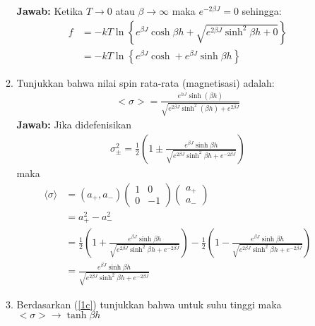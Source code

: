 \documentclass[a4paper , 12pt, cc]{article}
\begin{document}
\begin{enumerate}
\begin{enumerate}
 \textbf{Jawab:} \newline 
 Ketika $T \rightarrow 0$ atau $\beta \rightarrow \infty $ maka $e^{- 2 \beta J} = 0$ sehingga:
 \begin{align}
 f &= - kT \ln \left\{ e^{\beta J} \cosh \beta h + \sqrt{e^{2 \beta J} \sinh^2 \beta h + 0} \right\} \nonumber \\
 & =\boxed{ - kT \ln \left\lbrace e^{\beta J} \cosh + e^{\beta J}\sinh \beta h  \right \rbrace }
 \end{align}
\item \label{1c}Tunjukkan bahwa nilai spin rata-rata (magnetisasi) adalah:
\begin{align}
<\sigma> = \frac{e^{hJ} \sinh (\beta h)}{\sqrt{ e^{2 \beta J} \sinh^2 (\beta h) + e^{2 \beta J}}}
\end{align}
\textbf{Jawab:} \newline 
Jika didefenisikan 
\begin{align}
\sigma_{\pm}^2 = \frac{1}{2} \left( 1 \pm \frac{e^{\beta J} \sinh \beta h}{\sqrt{e^{2 \beta J} \sinh^2 \beta h + e^{-2 \beta J}}}\right)
\end{align}
maka 
\begin{align}
\langle \sigma \rangle  & = (a_+ , a_-) \left ( \begin{array}{ll}
1 & 0 \\ 
0 & - 1 
\end{array} \right )
\left ( 
\begin{array}{l}
a_+ \\
a_- 
\end{array}
 \right ) \nonumber \\
 & = a_+^2 - a_-^2 \nonumber \\
 & = \frac{1}{2} \left( 1 + \frac{e^{\beta J} \sinh \beta h }{\sqrt{ e^{2 \beta J} \sinh^2 \beta h + e^{- 2 \beta J}}}\right) - \frac{1}{2} \left( 1 - \frac{e^{\beta J} \sinh \beta h }{\sqrt{ e^{2 \beta J} \sinh^2 \beta h + e^{- 2 \beta J}}}\right) \nonumber \\
 & =\boxed{ \frac{e^{\beta J} \sinh \beta h }{\sqrt{ e^{2 \beta J} \sinh^2 \beta h + e^{- 2 \beta J}}}} \label{persamaan 1.d}
\end{align}
\pagebreak 
\item Berdasarkan (\ref{1c}) tunjukkan bahwa untuk suhu tinggi maka $<\sigma> \rightarrow \tanh \beta h$


\end{enumerate}
\end{enumerate}
\end{document}
